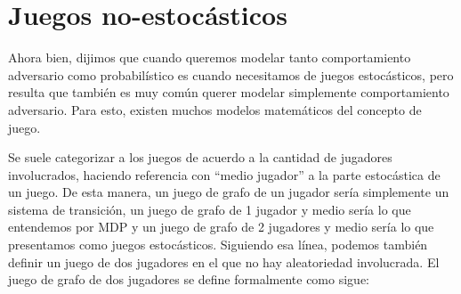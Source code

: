 





\section{Juegos no-estocásticos}

Ahora bien, dijimos que cuando queremos modelar tanto comportamiento adversario
como probabilístico es cuando necesitamos de juegos estocásticos, pero resulta
que también es muy común querer modelar simplemente comportamiento adversario.
Para esto, existen muchos modelos matemáticos del concepto de juego.

Se suele categorizar a los juegos de acuerdo a la cantidad de jugadores
involucrados, haciendo referencia con ``medio jugador'' a la parte estocástica
de un juego. De esta manera, un juego de grafo de un jugador sería simplemente
un sistema de transición, un juego de grafo de 1 jugador y medio sería lo que
entendemos por MDP y un juego de grafo de 2 jugadores y medio sería lo que
presentamos como juegos estocásticos. Siguiendo esa línea, podemos también
definir un juego de dos jugadores en el que no hay aleatoriedad involucrada. El
juego de grafo de dos jugadores se define formalmente como sigue:



